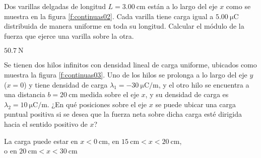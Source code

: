 %
\begin{Exercise}\label{p:continuas02}
  \textbf{\raisebox{.5pt}{\textcircled{\raisebox{-1.2pt} {E}}}} Dos varillas delgadas de longitud $L = \SI{3.00}{\centi\metre}$ están a lo largo del eje $x$ como se muestra en la figura \ref{f:continuas02}. Cada varilla tiene carga igual a $\SI{5.00}{\micro\coulomb}$ distribuida de manera uniforme en toda su longitud. Calcular el módulo de la fuerza que ejerce una varilla sobre la otra.
\end{Exercise}
\begin{Answer}
  $\SI{50.7}{\newton}$
\end{Answer}
%
\begin{center}
\end{center}
%
\begin{Exercise}\label{p:continuas03}
Se tienen dos hilos infinitos con densidad lineal de carga uniforme, ubicados como muestra la figura \ref{f:continuas03}. Uno de los hilos se prolonga a lo largo del eje $y$ ($x=0$) y tiene densidad de carga $\lambda_1 = \SI{-30}{\micro\coulomb/\metre}$, y el otro hilo se encuentra a una distancia $b = \SI{20}{\centi\metre}$ medida sobre el eje $x$, y su densidad de carga es $\lambda_2 = \SI{10}{\micro\coulomb/\metre}$. ¿En qué posiciones sobre el eje $x$ se puede ubicar una carga puntual positiva si se desea que la fuerza neta sobre dicha carga esté dirigida hacia el sentido positivo de $x$?
\end{Exercise}
\begin{Answer}
  \begin{minipage}[t]{.4\textwidth}
  La carga puede estar en $ x < \SI{0}{\centi\metre}$, en $\SI{15}{\centi\metre} < x < \SI{20}{\centi\metre}$,\\ o en $\SI{20}{\centi\metre} < x < \SI{30}{\centi\metre}$
  \end{minipage}
\end{Answer}
